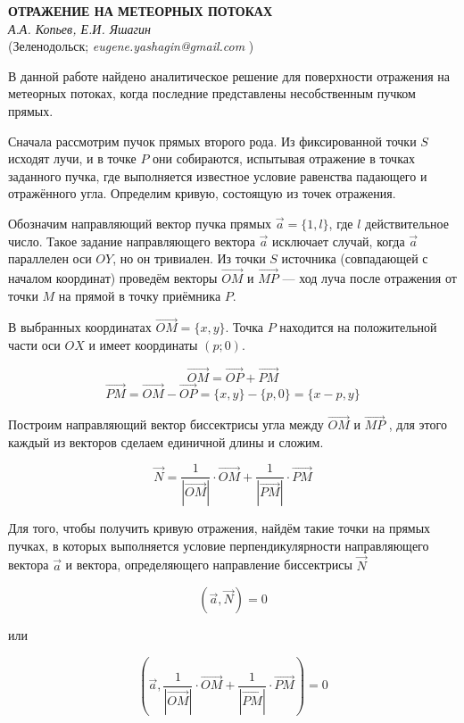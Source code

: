 \begin{center}{ \bf ОТРАЖЕНИЕ НА МЕТЕОРНЫХ ПОТОКАХ}\\
{\it А.А. Копьев, Е.И. Яшагин} \\
(Зеленодольск; {\it eugene.yashagin@gmail.com} )
\end{center}


В данной работе найдено аналитическое решение для поверхности отражения на метеорных потоках, когда последние представлены несобственным пучком прямых.

Сначала рассмотрим пучок прямых второго рода. Из фиксированной точки $S$ исходят лучи, и в точке $P$ они собираются, испытывая отражение в точках заданного пучка, где выполняется известное условие равенства падающего и отражённого угла. Определим кривую, состоящую из точек отражения.

Обозначим направляющий вектор пучка прямых $\vec a = \{ 1,l \}$, где $l$ действительное число. Такое задание направляющего вектора $\vec a $ исключает случай, когда $\vec a $ параллелен оси $ OY$, но он тривиален. Из точки $S$ источника (совпадающей с началом координат) проведём векторы $\overrightarrow{OM}$ и $\overrightarrow{MP}$ --- ход луча после отражения от точки $M$ на прямой в точку приёмника $P$.

В выбранных координатах $\overrightarrow{OM}=\{x,y\}$. Точка $P$ находится на положительной части оси $OX$ и имеет координаты $(p;0)$.


$$\overrightarrow{OM}=\overrightarrow{OP}+\overrightarrow{PM}$$
$$\overrightarrow{PM}=\overrightarrow{OM}-\overrightarrow{OP}=\{x,y\}-\{p,0\}=\{x-p,y\}$$

Построим направляющий вектор биссектрисы   угла между $\overrightarrow{OM}$ и $\overrightarrow{MP}$ , для этого каждый из векторов сделаем единичной длины и сложим.


$$ \vec{N}=\frac{1}{|\overrightarrow{OM}|}\cdot\overrightarrow{OM}+\frac{1}{|\overrightarrow{PM}|}\cdot\overrightarrow{PM} $$



Для того, чтобы получить кривую отражения, найдём такие точки на прямых пучках,
в которых выполняется условие перпендикулярности направляющего вектора $\vec a$ и  вектора,
определяющего направление биссектрисы $\vec N$

$$(\vec a,\vec N )=0$$

или

$$\left(\vec a,\frac{1}{|\overrightarrow{OM}|}\cdot\overrightarrow{OM}+\frac{1}{|\overrightarrow{PM}|}\cdot\overrightarrow{PM}\right) =0$$



